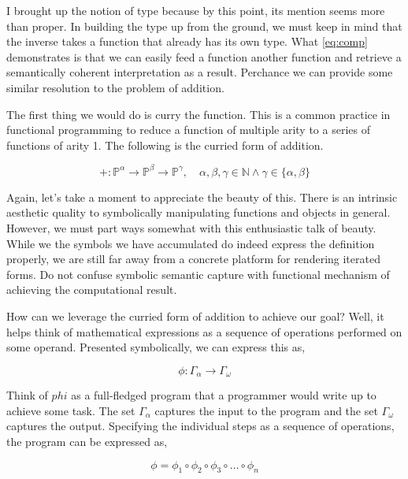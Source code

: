 I brought up the notion of type because by this point, its mention seems more
than proper. In building the type up from the ground, we must keep in mind that
the inverse takes a function that already has its own type. What \ref{eq:comp}
demonstrates is that we can easily feed a function another function and
retrieve a semantically coherent interpretation as a result. Perchance we can
provide some similar resolution to the problem of addition.

The first thing we would do is curry the function. This is a common practice in
functional programming to reduce a function of multiple arity to a series of
functions of arity 1. The following is the curried form of addition.

\begin{equation}
    +: \mathbb{P}^\alpha \rightarrow \mathbb{P}^\beta \rightarrow \mathbb{P}^\gamma, \quad \alpha, \beta, \gamma \in \mathbb{N} \land \gamma \in \{\alpha, \beta\}
\end{equation}

Again, let's take a moment to appreciate the beauty of this. There is an
intrinsic aesthetic quality to symbolically manipulating functions and objects
in general. However, we must part ways somewhat with this enthusiastic talk of
beauty. While we the symbols we have accumulated do indeed express the
definition properly, we are still far away from a concrete platform for
rendering iterated forms. Do not confuse symbolic semantic capture with
functional mechanism of achieving the computational result.

How can we leverage the curried form of addition to achieve our goal? Well, it
helps think of mathematical expressions as a sequence of operations performed
on some operand. Presented symbolically, we can express this as,

\begin{equation}
    \phi: \Gamma_\alpha \rightarrow \Gamma_\omega
\end{equation}

Think of $phi$ as a full-fledged program that a programmer would write up to
achieve some task. The set $\Gamma_\alpha$ captures the input to the program
and the set $\Gamma_\omega$ captures the output. Specifying the individual
steps as a sequence of operations, the program can be expressed as,

\begin{equation}
    \phi = \phi_1 \circ \phi_2 \circ \phi_3 \circ \dots \circ \phi_n
\end{equation}


